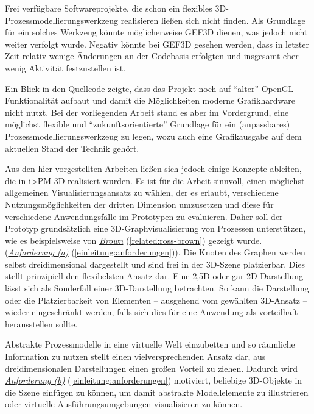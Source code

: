 \documentclass[a4paper,10pt]{sphinxmanual}
\begin{document}
Frei verfügbare Softwareprojekte, die schon ein flexibles 3D-Prozessmodellierungswerkzeug realisieren ließen sich nicht finden.
Als Grundlage für ein solches Werkzeug könnte möglicherweise GEF3D dienen, was jedoch nicht weiter verfolgt wurde.
Negativ könnte bei GEF3D gesehen werden, dass in letzter Zeit relativ wenige Änderungen an der Codebasis erfolgten und insgesamt eher wenig Aktivität festzustellen ist.

Ein Blick in den Quellcode zeigte, dass das Projekt noch auf "`alter"' OpenGL-Funktionalität aufbaut und damit die Möglichkeiten moderne Grafikhardware nicht nutzt.
Bei der vorliegenden Arbeit stand es aber im Vordergrund, eine möglichst flexible und "`zukunftsorientierte"' Grundlage für ein (anpassbares) Prozessmodellierungswerkzeug zu legen, wozu auch eine Grafikausgabe auf dem aktuellen Stand der Technik gehört.

Aus den hier vorgestellten Arbeiten ließen sich jedoch einige Konzepte ableiten, die in i\textgreater{}PM 3D realisiert wurden.
Es ist für die Arbeit sinnvoll, einen möglichst allgemeinen Visualisierungsansatz zu wählen, der es erlaubt, verschiedene Nutzungsmöglichkeiten der dritten Dimension umzusetzen und diese für verschiedene Anwendungsfälle im Prototypen zu evaluieren.
Daher soll der Prototyp grundsätzlich eine 3D-Graphvisualisierung von Prozessen unterstützen, wie es beispielsweise von {\hyperref[related:ross-brown]{\emph{Brown}}} (\autoref*{related:ross-brown}) gezeigt wurde. ({\hyperref[einleitung:anforderungen]{\emph{Anforderung (a)}}} (\autoref*{einleitung:anforderungen})).
Die Knoten des Graphen werden selbst dreidimensional dargestellt und sind frei in der 3D-Szene platzierbar. Dies stellt prinzipiell den flexibelsten Ansatz dar.
Eine 2,5D oder gar 2D-Darstellung lässt sich als Sonderfall einer 3D-Darstellung betrachten.
So kann die Darstellung oder die Platzierbarkeit von Elementen – ausgehend vom gewählten 3D-Ansatz – wieder eingeschränkt werden, falls sich dies für eine Anwendung als vorteilhaft herausstellen sollte.

Abstrakte Prozessmodelle in eine virtuelle Welt einzubetten und so räumliche Information zu nutzen stellt einen vielversprechenden Ansatz dar, aus dreidimensionalen Darstellungen einen großen Vorteil zu ziehen.
Dadurch wird {\hyperref[einleitung:anforderungen]{\emph{Anforderung (b)}}} (\autoref*{einleitung:anforderungen}) motiviert, beliebige 3D-Objekte in die Szene einfügen zu können, um damit abstrakte Modellelemente zu illustrieren oder virtuelle Ausführungsumgebungen visualisieren zu können.
\end{document}
